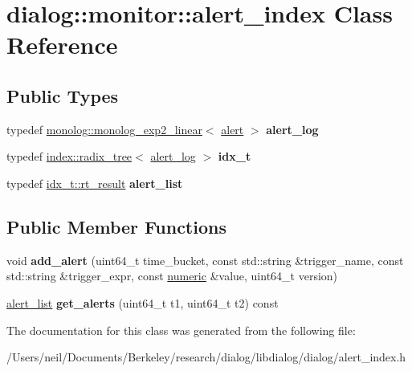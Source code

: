 \hypertarget{classdialog_1_1monitor_1_1alert__index}{}\section{dialog\+:\+:monitor\+:\+:alert\+\_\+index Class Reference}
\label{classdialog_1_1monitor_1_1alert__index}
\subsection*{Public Types}
\begin{DoxyCompactItemize}
\item 
\mbox{\label{classdialog_1_1monitor_1_1alert__index_a5bcff590f4b2b262d73459775d1191d5}} 
typedef \hyperlink{classdialog_1_1monolog_1_1monolog__exp2__linear}{monolog\+::monolog\+\_\+exp2\+\_\+linear}$<$ \hyperlink{structdialog_1_1monitor_1_1alert}{alert} $>$ {\bfseries alert\+\_\+log}
\item 
\mbox{\label{classdialog_1_1monitor_1_1alert__index_a53eb21bd9f555ededdd34215d335dd1b}} 
typedef \hyperlink{classdialog_1_1index_1_1radix__tree}{index\+::radix\+\_\+tree}$<$ \hyperlink{classdialog_1_1monolog_1_1monolog__exp2__linear}{alert\+\_\+log} $>$ {\bfseries idx\+\_\+t}
\item 
\mbox{\label{classdialog_1_1monitor_1_1alert__index_aaa5a77021b5c3bd07f3dc71250c7a1fc}} 
typedef \hyperlink{classflattened__container}{idx\+\_\+t\+::rt\+\_\+result} {\bfseries alert\+\_\+list}
\end{DoxyCompactItemize}
\subsection*{Public Member Functions}
\begin{DoxyCompactItemize}
\item 
\mbox{\label{classdialog_1_1monitor_1_1alert__index_aae17c973f4fe58b96ab27adb26b9bdc3}} 
void {\bfseries add\+\_\+alert} (uint64\+\_\+t time\+\_\+bucket, const std\+::string \&trigger\+\_\+name, const std\+::string \&trigger\+\_\+expr, const \hyperlink{classdialog_1_1numeric}{numeric} \&value, uint64\+\_\+t version)
\item 
\mbox{\label{classdialog_1_1monitor_1_1alert__index_a07e96cf06909185b98b03e061ca91e8d}} 
\hyperlink{classflattened__container}{alert\+\_\+list} {\bfseries get\+\_\+alerts} (uint64\+\_\+t t1, uint64\+\_\+t t2) const
\end{DoxyCompactItemize}


The documentation for this class was generated from the following file\+:\begin{DoxyCompactItemize}
\item 
/\+Users/neil/\+Documents/\+Berkeley/research/dialog/libdialog/dialog/alert\+\_\+index.\+h\end{DoxyCompactItemize}
